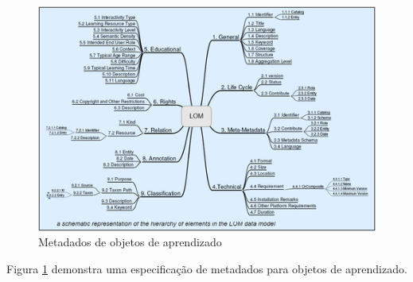 \documentclass[12pt,openright,oneside,a4paper,english,french,spanish,brazil]{unifil}
\begin{document}
\begin{figure}[htb]
	\centering
	\includegraphics[scale=1.0]{lom.png}
	\caption{Metadados de objetos de aprendizado}
	\label{img:lom}
\end{figure}
Figura \ref{img:lom} demonstra uma especificação de metadados para objetos de aprendizado.

\cleardoublepage

\postextual

\end{document}
